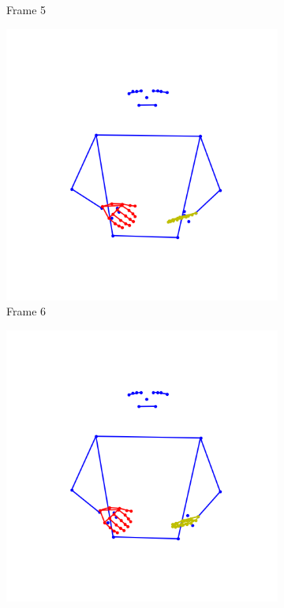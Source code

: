 \begin{figure}[t]
\begin{subfigure}[t]{0.3\textwidth}
		\caption{Frame 5 }
		\label{f:frame5}
	\end{subfigure}
	\vskip 0pt
	\begin{subfigure}[t]{0.3\textwidth}
	\centering
		\includegraphics[align=t,width=0.9\linewidth, height=0.9\linewidth]{Graphics/interpol_aborto_amar_6.png}
		\caption{Frame 6}
		\label{f:frame6}
	\end{subfigure}
	\begin{subfigure}[t]{0.3\textwidth}
	\centering
		\includegraphics[align=t,width=0.9\linewidth, height=0.9\linewidth]{Graphics/interpol_aborto_amar_7.png}

\end{subfigure}
\end{figure}

